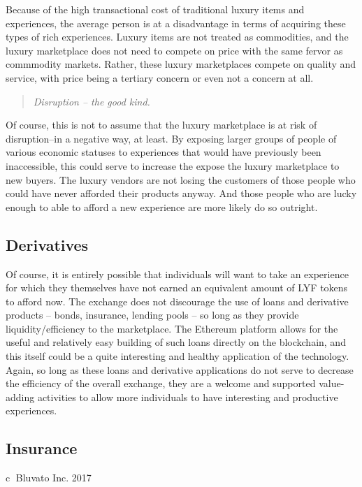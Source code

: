 \documentclass[11pt]{article}
\begin{document}
Because of the high transactional cost of traditional luxury items and experiences, the average person is at a disadvantage in terms of acquiring these types of rich experiences. Luxury items are not treated as commodities, and the luxury marketplace does not need to compete on price with the same fervor as commmodity markets. Rather, these luxury marketplaces compete on quality and service, with price being a tertiary concern or even not a concern at all.

\begin{quote}
\textit{
Disruption -- the good kind.
}
\end{quote}


Of course, this is not to assume that the luxury marketplace is at risk of disruption--in a negative way, at least. By exposing larger groups of people of various economic statuses to experiences that would have previously been inaccessible, this could serve to increase the expose the luxury marketplace to new buyers. The luxury vendors are not losing the customers of those people who could have never afforded their products anyway. And those people who are lucky enough to able to afford a new experience are more likely do so outright.


\subsection{Derivatives}
\label{sec-5-3}
Of course, it is entirely possible that individuals will want to take an experience for which they themselves have not earned an equivalent amount of LYF tokens to afford now. The exchange does not discourage the use of loans and derivative products -- bonds, insurance, lending pools -- so long as they provide liquidity/efficiency to the marketplace. The Ethereum platform allows for the useful and relatively easy building of such loans directly on the blockchain, and this itself could be a quite interesting and healthy application of the technology. Again, so long as these loans and derivative applications do not serve to decrease the efficiency of the overall exchange, they are a welcome and supported value-adding activities to allow more individuals to have interesting and productive experiences.

\subsection{Insurance}
\label{sec-5-4}

\printbibliography

\vspace*{\fill}

\begin{flushright}
{\textcircled{c}} Bluvato Inc. 2017


\end{flushright}
\end{document}
